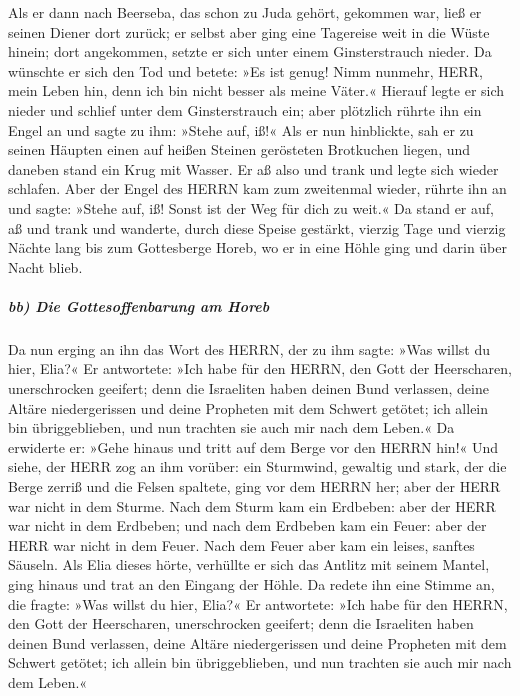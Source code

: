 Als er dann nach Beerseba, das schon zu Juda gehört, gekommen war, ließ
er seinen Diener dort zurück; er selbst aber ging eine
Tagereise weit in die Wüste hinein; dort angekommen, setzte er sich
unter einem Ginsterstrauch nieder. Da wünschte er sich den Tod und
betete: »Es ist genug! Nimm nunmehr, HERR, mein Leben hin, denn ich bin
nicht besser als meine Väter.« Hierauf legte er sich
nieder und schlief unter dem Ginsterstrauch ein; aber plötzlich rührte
ihn ein Engel an und sagte zu ihm: »Stehe auf, iß!« Als er
nun hinblickte, sah er zu seinen Häupten einen auf heißen Steinen
gerösteten Brotkuchen liegen, und daneben stand ein Krug mit Wasser. Er
aß also und trank und legte sich wieder schlafen. Aber der
Engel des HERRN kam zum zweitenmal wieder, rührte ihn an und sagte:
»Stehe auf, iß! Sonst ist der Weg für dich zu weit.« Da
stand er auf, aß und trank und wanderte, durch diese Speise gestärkt,
vierzig Tage und vierzig Nächte lang bis zum Gottesberge Horeb,
wo er in eine Höhle ging und darin über Nacht blieb.

\hypertarget{bb-die-gottesoffenbarung-am-horeb}{%
\subparagraph{bb) Die Gottesoffenbarung am
Horeb}\label{bb-die-gottesoffenbarung-am-horeb}}

Da nun erging an ihn das Wort des HERRN, der zu ihm sagte: »Was willst
du hier, Elia?« Er antwortete: »Ich habe für den HERRN,
den Gott der Heerscharen, unerschrocken geeifert; denn die Israeliten
haben deinen Bund verlassen, deine Altäre niedergerissen und deine
Propheten mit dem Schwert getötet; ich allein bin übriggeblieben, und
nun trachten sie auch mir nach dem Leben.« Da erwiderte
er: »Gehe hinaus und tritt auf dem Berge vor den HERRN hin!« Und siehe,
der HERR zog an ihm vorüber: ein Sturmwind, gewaltig und stark, der die
Berge zerriß und die Felsen spaltete, ging vor dem HERRN her; aber der
HERR war nicht in dem Sturme. Nach dem Sturm kam ein Erdbeben: aber der
HERR war nicht in dem Erdbeben; und nach dem Erdbeben kam
ein Feuer: aber der HERR war nicht in dem Feuer. Nach dem Feuer aber kam
ein leises, sanftes Säuseln. Als Elia dieses hörte,
verhüllte er sich das Antlitz mit seinem Mantel, ging hinaus und trat an
den Eingang der Höhle. Da redete ihn eine Stimme an, die fragte: »Was
willst du hier, Elia?« Er antwortete: »Ich habe für den
HERRN, den Gott der Heerscharen, unerschrocken geeifert; denn die
Israeliten haben deinen Bund verlassen, deine Altäre niedergerissen und
deine Propheten mit dem Schwert getötet; ich allein bin übriggeblieben,
und nun trachten sie auch mir nach dem Leben.«

